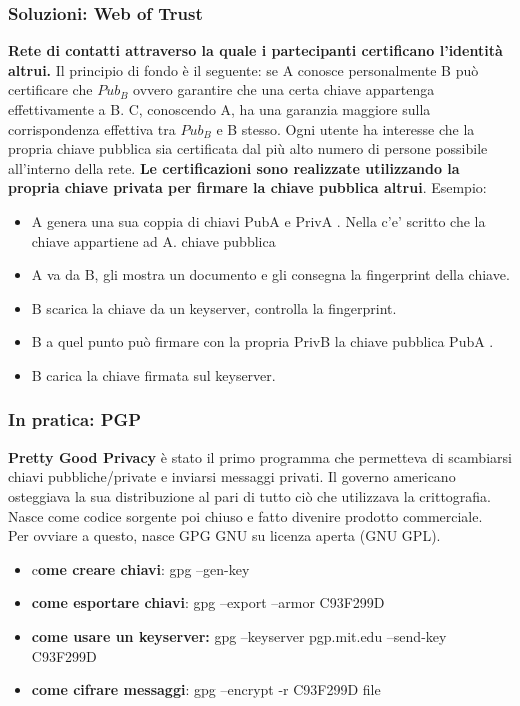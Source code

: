 \documentclass[12pt]{article}
\begin{document}
			\subsubsection{Soluzioni: Web of Trust}
				\textbf{Rete di contatti attraverso la quale i partecipanti certificano l'identità altrui.} Il principio di fondo è il seguente: se A conosce personalmente B può certificare che $Pub_{B}$ ovvero garantire che una certa chiave appartenga effettivamente a B. C, conoscendo A, ha una garanzia maggiore sulla corrispondenza effettiva tra $Pub_{B}$ e B stesso. Ogni utente ha interesse che la propria chiave pubblica sia certificata dal più alto numero di persone possibile all'interno della rete. \textbf{Le certificazioni sono realizzate utilizzando la propria chiave privata per firmare la chiave pubblica altrui}. Esempio: 
				\begin{itemize}
					\item A genera una sua coppia di chiavi PubA e PrivA . Nella c’e’ scritto che la chiave appartiene ad A. chiave pubblica
					\item A va da B, gli mostra un documento e gli consegna la fingerprint della chiave.
					\item B scarica la chiave da un keyserver, controlla la fingerprint.
					\item B a quel punto può firmare con la propria PrivB la chiave pubblica PubA .
					\item B carica la chiave firmata sul keyserver.
				\end{itemize}
			\subsubsection{In pratica: PGP}
				\textbf{Pretty Good Privacy} è stato il primo programma che permetteva di scambiarsi chiavi pubbliche/private e inviarsi messaggi privati. Il governo americano osteggiava la sua distribuzione al pari di tutto ciò che utilizzava la crittografia. Nasce come codice sorgente poi chiuso e fatto divenire prodotto commerciale.\\
				Per ovviare a questo, nasce GPG GNU su licenza aperta (GNU GPL).
				\begin{itemize}
					\item c\textbf{ome creare chiavi}: gpg –gen-key
					\item \textbf{come esportare chiavi}: gpg –export –armor C93F299D
					\item \textbf{come usare un keyserver:}
					gpg –keyserver pgp.mit.edu –send-key C93F299D
					\item \textbf{come cifrare messaggi}: gpg –encrypt -r C93F299D file
				\end{itemize}
\end{document}
